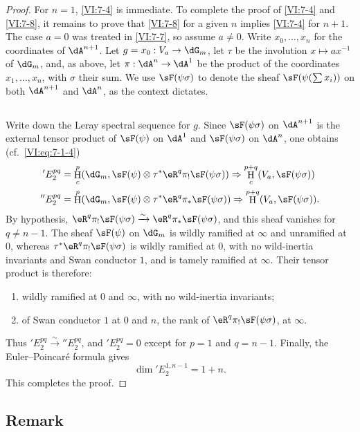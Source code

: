 \documentclass[12pt,oneside,english]{smfbook}
\DeclareMathOperator{\h}{H}
\newcommand{\iso}{\xrightarrow\sim}
\begin{document}
\begin{proof}
For $n=1$, \ref{VI:7-4} is immediate. To complete the proof of \ref{VI:7-4} and \ref{VI:7-8}, it remains to prove that \ref{VI:7-8} for a given $n$ implies \ref{VI:7-4} for $n+1$. The case $a=0$ was treated in \ref{VI:7-7}, so assume $a\ne0$. Write $x_0,\dots,x_n$ for the coordinates of $\dA^{n+1}$. Let $g=x_0:V_a\to\dG_m$, let $\tau$ be the involution $x\mapsto ax^{-1}$ of $\dG_m$, and, as above, let $\pi:\dA^n\to\dA^1$ be the product of the coordinates $x_1,\dots,x_n$, with $\sigma$ their sum. We use $\sF(\psi\sigma)$ to denote the sheaf $\sF(\psi(\sum x_i))$ on both $\dA^{n+1}$ and $\dA^n$, as the context dictates.

\subsection{}\label{VI:7-14}

Write down the Leray spectral sequence for $g$. Since $\sF(\psi\sigma)$ on $\dA^{n+1}$ is the external tensor product of $\sF(\psi)$ on $\dA^1$ and $\sF(\psi\sigma)$ on $\dA^n$, one obtains (cf.\ \eqref{VI:eq:7-1-4})
\begin{align*}
  'E_2^{p q} &= \h_c^p(\dG_m,\sF(\psi)\otimes \tau^\ast \eR^q \pi_! \sF(\psi\sigma)) \Rightarrow \h_c^{p+q}(V_a,\sF(\psi\sigma)) \\
  ''E_2^{p q} &= \h^p(\dG_m,\sF(\psi)\otimes \tau^\ast \eR^q \pi_\ast \sF(\psi\sigma)) \Rightarrow \h^{p+q}(V_a,\sF(\psi\sigma)) \text{.}
\end{align*}
By hypothesis, $\eR^q\pi_!\sF(\psi\sigma)\iso\eR^q\pi_\ast\sF(\psi\sigma)$, and this sheaf vanishes for $q\ne n-1$. The sheaf $\sF(\psi)$ on $\dG_m$ is wildly ramified at $\infty$ and unramified at $0$, whereas $\tau^\ast\eR^q\pi_!\sF(\psi\sigma)$ is wildly ramified at $0$, with no wild-inertia invariants and Swan conductor $1$, and is tamely ramified at $\infty$. Their tensor product is therefore:
\begin{enumerate}[\indent a)]
  \item wildly ramified at $0$ and $\infty$, with no wild-inertia invariants;
  \item of Swan conductor $1$ at $0$ and $n$, the rank of $\eR^q\pi_!\sF(\psi\sigma)$, at $\infty$.
\end{enumerate}
Thus $'E_2^{pq}\iso{}''E_2^{pq}$, and $'E_2^{pq}=0$ except for $p=1$ and $q=n-1$. Finally, the Euler--Poincaré formula gives
\[
  \dim{}'E_2^{1,n-1}=1+n.
\]
This completes the proof.
\end{proof}

\subsection{Remark}\label{VI:7-15}
\end{document}
